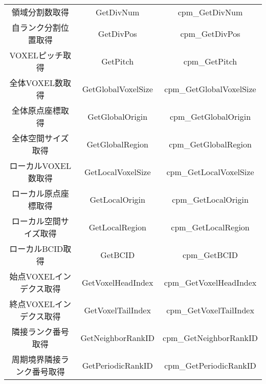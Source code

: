 \begin{table}[htb]
\begin{center}
\begin{tabular}{|c|c|c|}
領域分割数取得                   & GetDivNum                   & cpm\_GetDivNum \\
自ランク分割位置取得             & GetDivPos                   & cpm\_GetDivPos \\
VOXELピッチ取得                  & GetPitch                    & cpm\_GetPitch \\
全体VOXEL数取得                  & GetGlobalVoxelSize          & cpm\_GetGlobalVoxelSize \\
全体原点座標取得                 & GetGlobalOrigin             & cpm\_GetGlobalOrigin \\
全体空間サイズ取得               & GetGlobalRegion             & cpm\_GetGlobalRegion \\
ローカルVOXEL数取得              & GetLocalVoxelSize           & cpm\_GetLocalVoxelSize \\
ローカル原点座標取得             & GetLocalOrigin              & cpm\_GetLocalOrigin \\
ローカル空間サイズ取得           & GetLocalRegion              & cpm\_GetLocalRegion \\
ローカルBCID取得                 & GetBCID                     & cpm\_GetBCID \\
始点VOXELインデクス取得          & GetVoxelHeadIndex           & cpm\_GetVoxelHeadIndex \\
終点VOXELインデクス取得          & GetVoxelTailIndex           & cpm\_GetVoxelTailIndex \\
隣接ランク番号取得               & GetNeighborRankID           & cpm\_GetNeighborRankID \\
周期境界隣接ランク番号取得       & GetPeriodicRankID           & cpm\_GetPeriodicRankID \\
\hline
\end{tabular}
\end{center}
\end{table}

\clearpage

